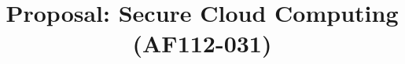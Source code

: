 \documentclass[10pt,draft]{article}
\begin{document}
\title{Proposal: Secure Cloud Computing (AF112-031)}

\maketitle







\end{document}
